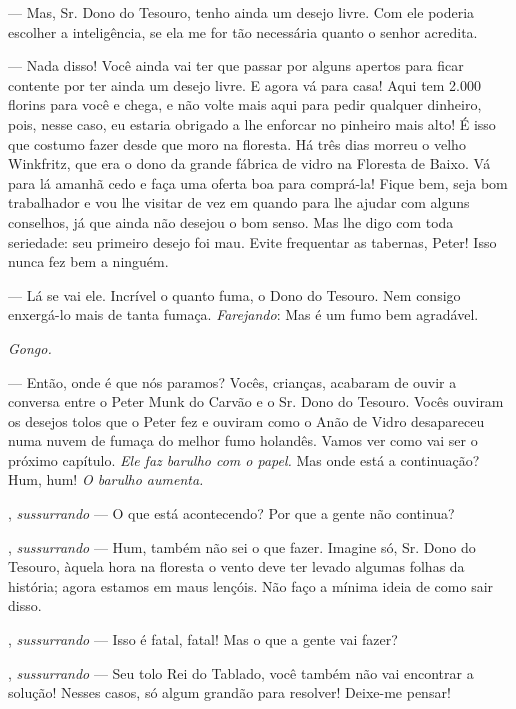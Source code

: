 \begin{myparindent}{0pt}
\begin{Parskip}
 --- Mas, Sr. Dono do Tesouro, tenho ainda um desejo
livre. Com ele poderia escolher a inteligência, se ela me for tão
necessária quanto o senhor acredita.

 --- Nada disso! Você ainda vai ter que passar por alguns
apertos para ficar contente por ter ainda um desejo livre. E agora vá
para casa! Aqui tem 2.000 florins para você e chega, e não volte mais
aqui para pedir qualquer dinheiro, pois, nesse caso, eu estaria obrigado
a lhe enforcar no pinheiro mais alto! É isso que costumo fazer desde que
moro na floresta. Há três dias morreu o velho Winkfritz, que era o dono
da grande fábrica de vidro na Floresta de Baixo. Vá para lá amanhã cedo
e faça uma oferta boa para comprá-la! Fique bem, seja bom trabalhador e
vou lhe visitar de vez em quando para lhe ajudar com alguns conselhos,
já que ainda não desejou o bom senso. Mas lhe digo com toda seriedade:
seu primeiro desejo foi mau. Evite frequentar as tabernas, Peter! Isso
nunca fez bem a ninguém.

 --- Lá se vai ele. Incrível o quanto fuma, o Dono do
Tesouro. Nem consigo enxergá-lo mais de tanta fumaça. \emph{Farejando}:
Mas é um fumo bem agradável.

\emph{Gongo.}

 --- Então, onde é que nós paramos? Vocês, crianças, acabaram de
ouvir a conversa entre o Peter Munk do Carvão e o Sr. Dono do Tesouro.
Vocês ouviram os desejos tolos que o Peter fez e ouviram como o Anão de
Vidro desapareceu numa nuvem de fumaça do melhor fumo holandês. Vamos
ver como vai ser o próximo capítulo. \emph{Ele faz barulho com o papel.}
Mas onde está a continuação? Hum, hum! \emph{O barulho aumenta.}

, \emph{sussurrando} --- O que está acontecendo? Por que a
gente não continua?

, \emph{sussurrando} --- Hum, também não sei o que fazer. Imagine
só, Sr. Dono do Tesouro, àquela hora na floresta o vento deve ter levado
algumas folhas da história; agora estamos em maus lençóis. Não faço a
mínima ideia de como sair disso.

, \emph{sussurrando} --- Isso é fatal, fatal! Mas o que a
gente vai fazer?

, \emph{sussurrando} --- Seu tolo Rei do Tablado, você
também não vai encontrar a solução! Nesses casos, só algum grandão para
resolver! Deixe-me pensar!


\end{Parskip}
\end{myparindent}
